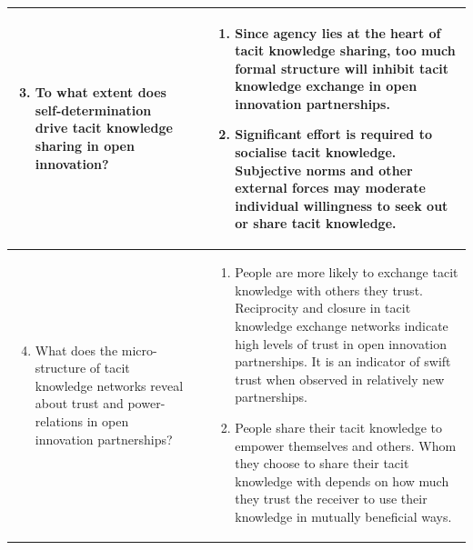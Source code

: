 \begin{table}
{\begin{tabular}{lcl}
\begin{minipage}{0.35\linewidth}\renewcommand{\theenumi}{\arabic{enumi}} \begin{enumerate} \setcounter{enumi}{2} \item To what extent does self-determination drive tacit knowledge sharing in open innovation? \end{enumerate} \end{minipage} && \begin{minipage}{0.55\linewidth}\renewcommand{\theenumi}{\alph{enumi}}\begin{enumerate}
\item Since agency lies at the heart of tacit knowledge sharing, too much formal structure will inhibit tacit knowledge exchange in open innovation partnerships. 
\item Significant effort is required to socialise tacit knowledge. Subjective norms and other external forces may moderate individual willingness to seek out or share tacit knowledge. \end{enumerate} \end{minipage} \\ \midrule

\begin{minipage}{0.35\linewidth} \renewcommand{\theenumi}{\arabic{enumi}} \begin{enumerate} \setcounter{enumi}{3} \item What does the micro-structure of tacit knowledge networks reveal about trust and power-relations in open innovation partnerships? \end{enumerate} \end{minipage} && \begin{minipage}{0.55\linewidth}\renewcommand{\theenumi}{\alph{enumi}}\begin{enumerate}
\item People are more likely to exchange tacit knowledge with others they trust. Reciprocity and closure in tacit knowledge exchange networks indicate high levels of trust in open innovation partnerships. It is an indicator of swift trust when observed in relatively new partnerships. 
\item People share their tacit knowledge to empower themselves and others. Whom they choose to share their tacit knowledge with depends on how much they trust the receiver to use their knowledge in mutually beneficial ways. \end{enumerate} \end{minipage}\\ \bottomrule
\end{tabular}
}
\end{table}

